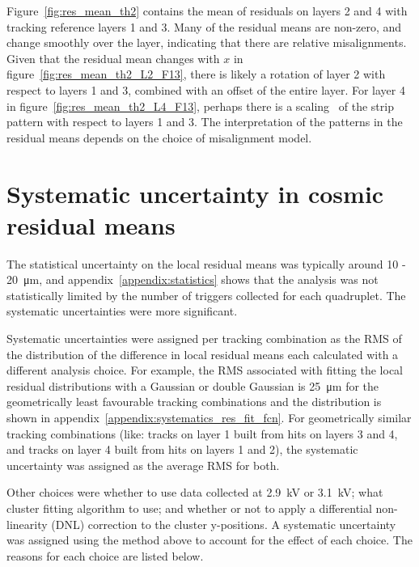 Figure~\ref{fig:res_mean_th2} contains the mean of residuals on layers 2 and 4 with tracking reference layers 1 and 3. Many of the residual means are non-zero, and change smoothly over the layer, indicating that there are relative misalignments. Given that the residual mean changes with $x$ in figure~\ref{fig:res_mean_th2_L2_F13}, there is likely a rotation of layer 2 with respect to layers 1 and 3, combined with an offset of the entire layer. For layer 4 in figure~\ref{fig:res_mean_th2_L4_F13}, perhaps there is a scaling~\cite{carlson_results_2019} of the strip pattern with respect to layers 1 and 3. The interpretation of the patterns in the residual means depends on the choice of misalignment model.

\section{Systematic uncertainty in cosmic residual means}

The statistical uncertainty on the local residual means was typically around \SI{10}{} - \SI{20}{\micro\meter}, and appendix~\ref{appendix:statistics} shows that the analysis was not statistically limited by the number of triggers collected for each quadruplet. The systematic uncertainties were more significant. 

Systematic uncertainties were assigned per tracking combination as the RMS of the distribution of the difference in local residual means each calculated with a different analysis choice. For example, the RMS associated with fitting the local residual distributions with a Gaussian or double Gaussian is \SI{25}{\micro\meter} for the geometrically least favourable tracking combinations and the distribution is shown in appendix~\ref{appendix:systematics_res_fit_fcn}. For geometrically similar tracking combinations (like: tracks on layer 1 built from hits on layers 3 and 4, and tracks on layer 4 built from hits on layers 1 and 2), the systematic uncertainty was assigned as the average RMS for both.

Other choices were whether to use data collected at 2.9~kV or 3.1~kV; what cluster fitting algorithm to use; and whether or not to apply a differential non-linearity (DNL) correction to the cluster y-positions. A systematic uncertainty was assigned using the method above to account for the effect of each choice. The reasons for each choice are listed below.


